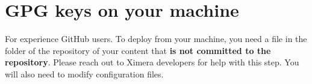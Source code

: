 \documentclass{ximera}
\begin{document}
\pdfOnly{\twocolumn} %

\section{GPG keys on your machine}

For experience GitHub users. To deploy from your machine, you need a file in
the folder of the repository of
your content that \textbf{is not committed to the repository}. Please reach out
to Ximera developers for help with this step. You will also need to modify
configuration files.

\end{document}
